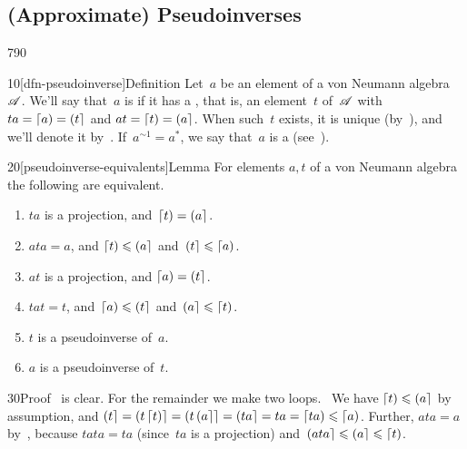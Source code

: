 \subsection{(Approximate) Pseudoinverses}
\begin{parsec}{790}%
\begin{point}{10}[dfn-pseudoinverse]{Definition}%
Let~$a$ be an element of a von Neumann algebra~$\mathscr{A}$.
We'll say that~$a$ is %
if it has a ,
that is,
an element~$t$ of~$\mathscr{A}$
with 
$ta=\left\lceil a\right)=\left(t\right\rceil$
and $at=\left\lceil t\right)=\left(a\right\rceil$.
When such~$t$ exists,
it is unique (by~),
and we'll denote it by~.%
If~$a^{\sim1}=a^*$,
we say that~$a$ is a %
(see~).
\end{point}
\begin{point}{20}[pseudoinverse-equivalents]{Lemma}%
For elements $a,t$ of a von Neumann algebra
the following are equivalent.
\begin{enumerate}
\item
\label{pseudoinverse-1}
$ta$ is a projection, and~$\left\lceil t\right)=\left(a\right\rceil$.
\item
\label{pseudoinverse-2}
$ata=a$, and $\left\lceil t\right)\leqslant \left(a\right\rceil$ and~$\left(t\right\rceil\leqslant \left\lceil a\right)$.
\item
\label{pseudoinverse-3}
$at$ is a projection, and $\left\lceil a\right)=\left(t\right\rceil$.
\item
\label{pseudoinverse-4}
$tat=t$, and~$\left\lceil a\right)\leqslant \left(t\right\rceil$ and~$\left(a\right\rceil\leqslant \left\lceil t\right)$.
\item
\label{pseudoinverse-5}
$t$ is a pseudoinverse of~$a$.
\item
\label{pseudoinverse-6}
$a$ is a pseudoinverse of~$t$.
\end{enumerate}
\spacingfix%
\begin{point}{30}{Proof}%
\grayed{(\ref{pseudoinverse-5}$\iff$%
\ref{pseudoinverse-6})}\ 
is clear.
For the remainder we  make two loops.
\grayed{(\ref{pseudoinverse-1}$\Longrightarrow$\ref{pseudoinverse-2})}\ 
We have $\left\lceil t\right)\leqslant \left(a\right\rceil$ by assumption,
and $\left(t\right\rceil=\left(t\left\lceil t\right)\right\rceil
=\left(t\left(a\right\rceil\right\rceil
=\left(ta\right\rceil=ta=\left\lceil ta\right)\leqslant\left\lceil a\right)$.
Further, $ata=a$
by~,
because $tata=ta$ (since~$ta$ is a projection)
and~$\left(ata\right\rceil\leqslant \left(a\right\rceil\leqslant\left\lceil t\right)$.
\grayed{(\ref{pseudoinverse-3}$\Longrightarrow$\ref{pseudoinverse-4})} 

\end{point}
\end{point}
\end{parsec}
